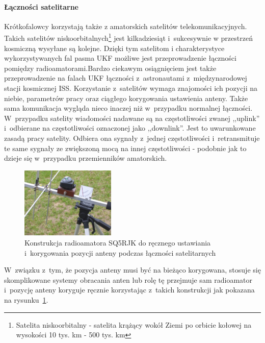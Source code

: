 \documentclass[]{mgr}
\begin{document}
                    \paragraph{Łączności satelitarne}
                    Krótkofalowcy korzystają także z amatorskich satelitów telekomunikacyjnych. Takich satelitów niskoorbitalnych\footnote{Satelita niskoorbitalny - satelita krążący wokół Ziemi po orbicie kołowej na wysokości 10 tys. km - 500 tys. km} jest kilkadziesiąt i~sukcesywnie w przestrzeń kosmiczną wysyłane są kolejne. Dzięki tym satelitom i charakterystyce wykorzystywanych fal pasma UKF możliwe jest przeprowadzenie łączności pomiędzy radioamatorami.Bardzo ciekawym osiągnięciem jest także przeprowadzenie na falach UKF łączności z~astronautami z~międzynarodowej stacji kosmicznej ISS. Korzystanie z~satelitów wymaga znajomości ich pozycji na niebie, parametrów pracy oraz ciągłego korygowania ustawienia anteny. Także sama komunikacja wygląda nieco inaczej niż w~przypadku normalnej łączności. W~przypadku satelity wiadomości nadawane są na częstotliwości zwanej ,,uplink'' i~odbierane na częstotliwości oznaczonej jako ,,downlink''. Jest to uwarunkowane zasadą pracy satelity. Odbiera ona sygnały z~jednej częstotliwości i~retransmituje te same sygnały ze zwiększoną mocą na innej częstotliwości - podobnie jak to dzieje się w~przypadku przemienników amatorskich.
                        \begin{figure}
                            \vspace{-25pt}
                            \begin{center}
                                \includegraphics[width=0.4\textwidth]{example_sat_construction}
                            \end{center}
                            \vspace{-20pt}
                            \caption{Konstrukcja radioamatora SQ5RJK do ręcznego ustawiania i~korygowania pozycji anteny podczas łączności satelitarnych}
                            \vspace{-50pt}
                            \label{fig:example_sat_construction}
                        \end{figure}
                    W~związku z~tym, że pozycja anteny musi być na bieżąco korygowana, stosuje się skomplikowane systemy obracania anten lub rolę tę przejmuje sam radioamator i~pozycję anteny koryguje ręcznie korzystając z~takich konstrukcji jak pokazana na rysunku~\ref{fig:example_sat_construction}.
\end{document}
